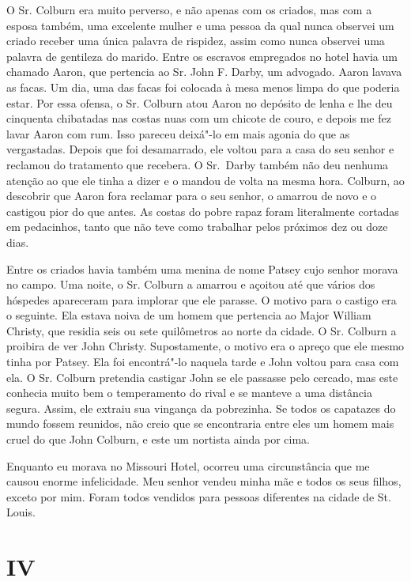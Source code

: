 O Sr. Colburn era muito perverso, e não apenas com os criados, mas com a
esposa também, uma excelente mulher e uma pessoa da qual nunca observei
um criado receber uma única palavra de rispidez, assim como nunca
observei uma palavra de gentileza do marido. Entre os escravos
empregados no hotel havia um chamado Aaron, que pertencia ao Sr. John F.
Darby, um advogado. Aaron lavava as facas. Um dia, uma das facas foi
colocada à mesa menos limpa do que poderia estar. Por essa ofensa, o Sr.
Colburn atou Aaron no depósito de lenha e lhe deu cinquenta chibatadas
nas costas nuas com um chicote de couro, e depois me fez lavar Aaron com
rum. Isso pareceu deixá"-lo em mais agonia do que as vergastadas. Depois
que foi desamarrado, ele voltou para a casa do seu senhor e reclamou do
tratamento que recebera. O Sr.~Darby também não deu nenhuma atenção ao
que ele tinha a dizer e o mandou de volta na mesma hora. Colburn, ao
descobrir que Aaron fora reclamar para o seu senhor, o amarrou de novo e
o castigou pior do que antes. As costas do pobre rapaz foram
literalmente cortadas em pedacinhos, tanto que não teve como trabalhar
pelos próximos dez ou doze dias.

Entre os criados havia também uma menina de nome Patsey cujo senhor
morava no campo. Uma noite, o Sr. Colburn a amarrou e açoitou até que
vários dos hóspedes apareceram para implorar que ele parasse. O motivo
para o castigo era o seguinte. Ela estava noiva de um homem que
pertencia ao Major William Christy, que residia seis ou sete quilômetros
ao norte da cidade. O Sr. Colburn a proibira de ver John Christy.
Supostamente, o motivo era o apreço que ele mesmo tinha por Patsey. Ela
foi encontrá"-lo naquela tarde e John voltou para casa com ela. O Sr.
Colburn pretendia castigar John se ele passasse pelo cercado, mas este
conhecia muito bem o temperamento do rival e se manteve a uma distância
segura. Assim, ele extraiu sua vingança da pobrezinha. Se todos os
capatazes do mundo fossem reunidos, não creio que se encontraria entre
eles um homem mais cruel do que John Colburn, e este um nortista ainda
por cima.

Enquanto eu morava no Missouri Hotel, ocorreu uma circunstância que me
causou enorme infelicidade. Meu senhor vendeu minha mãe e todos os seus
filhos, exceto por mim. Foram todos vendidos para pessoas diferentes na
cidade de St. Louis.

\chapter{IV}

